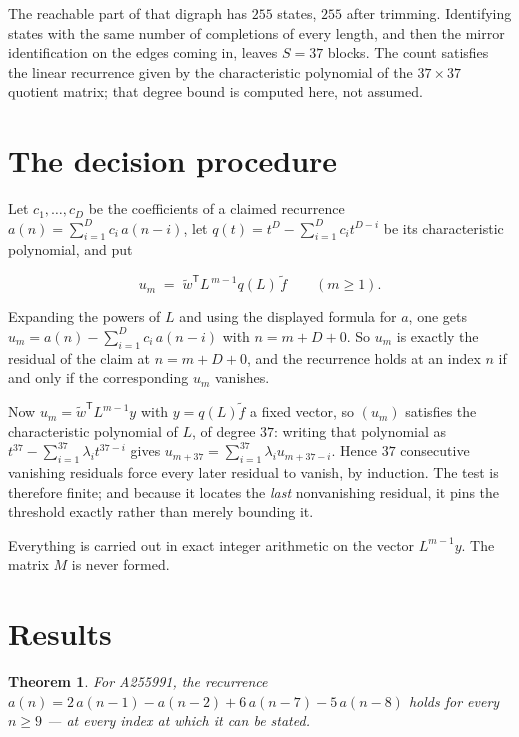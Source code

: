 \documentclass[11pt]{article}
\newtheorem{theorem}{Theorem}
\theoremstyle{definition}
\begin{document}
The reachable part of that digraph has $255$ states, $255$ after trimming. Identifying states with the same number of completions of every length, and then the mirror identification on the edges coming in, leaves $S = 37$ blocks. The count satisfies the linear recurrence given by the characteristic polynomial of the $37\times37$ quotient matrix; that degree bound is computed here, not assumed.

\section{The decision procedure}

Let $c_1,\dots,c_D$ be the coefficients of a claimed recurrence $a(n) = \sum_{i=1}^{D} c_i\,a(n-i)$, let $q(t) = t^{D} - \sum_{i=1}^{D} c_i t^{D-i}$ be its characteristic polynomial, and put

\[u_m \;=\; \tilde w^{\mathsf T} L^{\,m-1} q(L)\,\tilde f \qquad (m \ge 1).\]

Expanding the powers of $L$ and using the displayed formula for $a$, one gets $u_m = a(n) - \sum_{i=1}^{D} c_i\,a(n-i)$ with $n = m + D + 0$. So $u_m$ is exactly the residual of the claim at $n = m + D + 0$, and the recurrence holds at an index $n$ if and only if the corresponding $u_m$ vanishes.

Now $u_m = \tilde w^{\mathsf T} L^{m-1} y$ with $y = q(L)\tilde f$ a fixed vector, so $(u_m)$ satisfies the characteristic polynomial of $L$, of degree $37$: writing that polynomial as $t^{37} - \sum_{i=1}^{37} \lambda_i t^{37-i}$ gives $u_{m+37} = \sum_{i=1}^{37} \lambda_i u_{m+37-i}$. Hence $37$ consecutive vanishing residuals force every later residual to vanish, by induction. The test is therefore finite; and because it locates the {\itshape last} nonvanishing residual, it pins the threshold exactly rather than merely bounding it.

Everything is carried out in exact integer arithmetic on the vector $L^{m-1}y$. The matrix $M$ is never formed.

\section{Results}

\begin{theorem} For A255991, the recurrence $a(n) = 2\,a(n-1) - a(n-2) + 6\,a(n-7) - 5\,a(n-8)$ holds for every $n \ge 9$ --- at every index at which it can be stated.\end{theorem}
\end{document}
